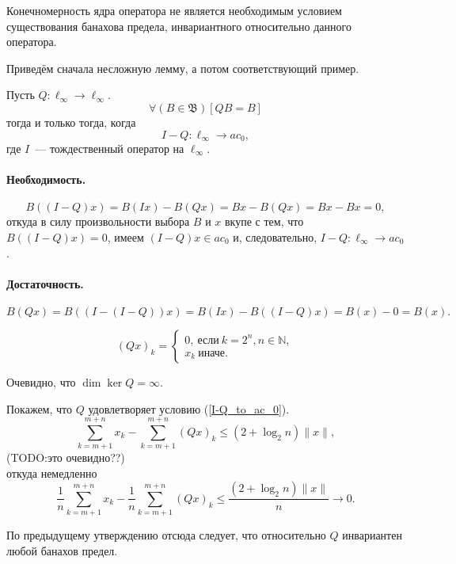Конечномерность ядра оператора не является необходимым условием существования
банахова предела, инвариантного относительно данного оператора.

Приведём сначала несложную лемму, а потом соответствующий пример.

\begin{lemma}

	Пусть $Q:\ell_\infty \to \ell_\infty$.
	\begin{equation}
		\forall(B\in\mathfrak{B})[QB = B]
	\end{equation}
	тогда и только тогда, когда
	\begin{equation}\label{I-Q_to_ac_0}
		I-Q : \ell_\infty \to ac_0,
	\end{equation}
	где $I$~--- тождественный оператор на $\ell_\infty$.

\end{lemma}

\paragraph{Необходимость.}
\begin{equation}
	B((I-Q)x) =
	B(Ix) - B(Qx) =
	Bx - B(Qx)=
	Bx-Bx
	=
	0
	,
\end{equation}
откуда в силу произвольности выбора $B$ и $x$ вкупе с тем, что $B((I-Q)x)=0$,
имеем $(I-Q)x \in ac_0$ и, следовательно, $I-Q : \ell_\infty \to ac_0$.

\paragraph{Достаточность.}
\begin{equation}
	B(Qx) = B((I-(I-Q))x) =
	B(Ix)-B((I-Q)x) =
	B(x) - 0 = B(x).
\end{equation}


\begin{example}
	\begin{equation}
		(Qx)_k =
		\begin{cases}
			0,~\mbox{если}~ k = 2^n, n \in\mathbb{N},
			\\
			x_k~\mbox{иначе.}
		\end{cases}
	\end{equation}
\end{example}
Очевидно, что $\dim \ker Q = \infty$.

Покажем, что $Q$ удовлетворяет условию (\ref{I-Q_to_ac_0}).
\begin{equation}
	\sum_{k=m+1}^{m+n} x_k - \sum_{k=m+1}^{m+n} (Qx)_k \leqslant (2 + \log_2 n) \|x\|,
\end{equation}
(TODO:это очевидно??)\\
откуда немедленно
\begin{equation}
	\frac{1}{n}\sum_{k=m+1}^{m+n} x_k - \frac{1}{n}\sum_{k=m+1}^{m+n} (Qx)_k \leqslant \frac{(2 + \log_2 n) \|x\|}{n} \to 0.
\end{equation}

По предыдущему утверждению отсюда следует, что относительно $Q$ инвариантен любой банахов предел.
